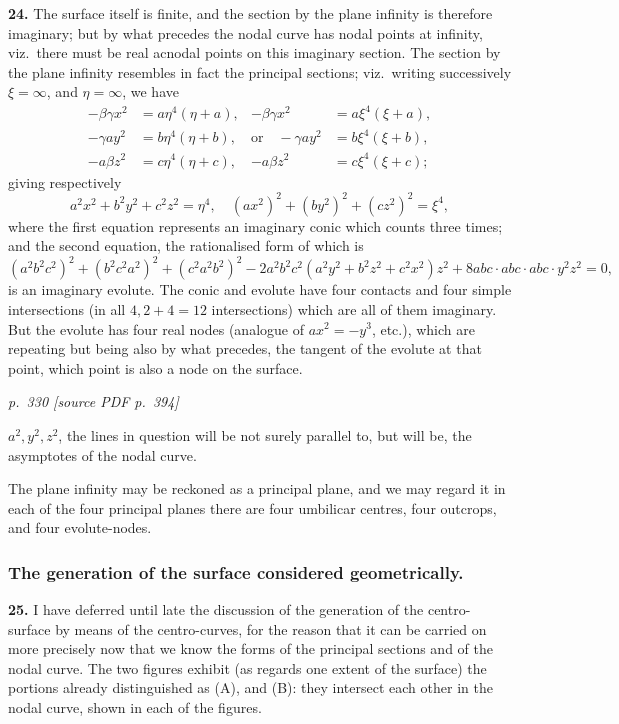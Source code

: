 \documentclass[11pt,a4paper]{article}
\newcommand{\pagemarker}[2]{\par\bigskip\noindent\textit{p.~#1 [source PDF p.~#2]}\par\smallskip}
\begin{document}
\textbf{24.} The surface itself is finite, and the section by the plane infinity is therefore imaginary; but by what precedes the nodal curve has nodal points at infinity, viz.\ there must be real acnodal points on this imaginary section. The section by the plane infinity resembles in fact the principal sections; viz.\ writing successively $\xi = \infty$, and $\eta = \infty$, we have
\begin{align*}
-\beta\gamma x^2 &= a\eta^4(\eta + a), & -\beta\gamma x^2 &= a\xi^4(\xi + a),\\
-\gamma a y^2 &= b\eta^4(\eta + b), & \text{or}\quad -\gamma a y^2 &= b\xi^4(\xi + b),\\
-a\beta z^2 &= c\eta^4(\eta + c), & -a\beta z^2 &= c\xi^4(\xi + c);
\end{align*}
giving respectively
\[
a^2 x^2 + b^2 y^2 + c^2 z^2 = \eta^4,\quad (a x^2)^2 + (b y^2)^2 + (c z^2)^2 = \xi^4,
\]
where the first equation represents an imaginary conic which counts three times; and the second equation, the rationalised form of which is
\[
(a^2 b^2 c^2)^2 + (b^2 c^2 a^2)^2 + (c^2 a^2 b^2)^2 - 2a^2 b^2 c^2 (a^2 y^2 + b^2 z^2 + c^2 x^2) z^2 + 8a b c \cdot a b c \cdot a b c \cdot y^2 z^2 = 0,
\]
is an imaginary evolute. The conic and evolute have four contacts and four simple intersections (in all $4, 2 + 4 = 12$ intersections) which are all of them imaginary. But the evolute has four real nodes (analogue of $a x^2 = -y^3$, etc.), which are repeating but being also by what precedes, the tangent of the evolute at that point, which point is also a node on the surface.

\clearpage

\pagemarker{330}{394}

$a^2, y^2, z^2$, the lines in question will be not surely parallel to, but will be, the asymptotes of the nodal curve.

The plane infinity may be reckoned as a principal plane, and we may regard it in each of the four principal planes there are four umbilicar centres, four outcrops, and four evolute-nodes.

\subsubsection*{The generation of the surface considered geometrically.}

\textbf{25.} I have deferred until late the discussion of the generation of the centro-surface by means of the centro-curves, for the reason that it can be carried on more precisely now that we know the forms of the principal sections and of the nodal curve. The two figures exhibit (as regards one extent of the surface) the portions already distinguished as (A), and (B): they intersect each other in the nodal curve, shown in each of the figures.
\end{document}

